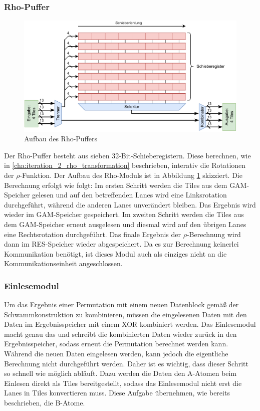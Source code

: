 \subsubsection{Rho-Puffer}
\begin{figure}
	\center
	\includegraphics{images/Rho-Aufbau.pdf}
	\caption{Aufbau des Rho-Puffers}
	\label{fig:rho_aufbau_iteration_3}
\end{figure}
Der Rho-Puffer besteht aus sieben 32-Bit-Schieberegistern. Diese berechnen, wie in \ref{cha:iteration_2_rho_transformation} beschrieben,
interativ die Rotationen der $\rho$-Funktion. Der Aufbau des Rho-Moduls ist in Abbildung \ref{fig:rho_aufbau_iteration_3} skizziert.
Die Berechnung erfolgt wie folgt: Im ersten Schritt werden die Tiles aus dem GAM-Speicher gelesen und auf den betreffenden Lanes
wird eine Linksrotation durchgeführt, während die anderen Lanes unverändert bleiben. Das Ergebnis wird wieder im GAM-Speicher gespeichert.
Im zweiten Schritt werden die Tiles aus dem GAM-Speicher erneut ausgelesen und diesmal wird auf den übrigen Lanes eine Rechtsrotation durchgeführt.
Das finale Ergebnis der $\rho$-Berechnung wird dann im RES-Speicher wieder abgespeichert. Da es zur Berechnung keinerlei Kommunikation benötigt,
ist dieses Modul auch als einziges nicht an die Kommunikationseinheit angeschlossen.

\subsubsection{Einlesemodul}
Um das Ergebnis einer Permutation mit einem neuen Datenblock gemäß der Schwammkonstruktion zu kombinieren, müssen die eingelesenen Daten
mit den Daten im Ergebnisspeicher mit einem XOR kombiniert werden. Das Einlesemodul macht genau das und schreibt die kombinierten Daten
wieder zurück in den Ergebnisspeicher, sodass erneut die Permutation berechnet werden kann. Während die neuen Daten eingelesen werden,
kann jedoch die eigentliche Berechnung nicht durchgeführt werden. Daher ist es wichtig, dass dieser Schritt so schnell wie möglich abläuft.
Dazu werden die Daten den A-Atomen beim Einlesen direkt als Tiles bereitgestellt, sodass das Einlesemodul nicht erst die Lanes in Tiles konvertieren muss.
Diese Aufgabe übernehmen, wie bereits beschrieben, die B-Atome.

